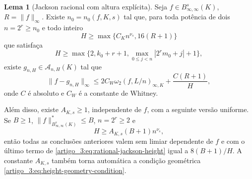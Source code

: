 \documentclass[12pt,a4paper]{article}
\theoremstyle{preciso}
\theoremstyle{definition}
\newcommand{\Aclass}{\mathcal{A}}
\theoremstyle{preciso}
\theoremstyle{preciso}
\newtheorem{lemma}[teorema]{Lema}
\theoremstyle{preciso}
\theoremstyle{preciso}
\theoremstyle{definition}
\theoremstyle{preciso}
\theoremstyle{definition}
\theoremstyle{preciso}
\theoremstyle{preciso}
\theoremstyle{definition}
\begin{document}
\begin{lemma}[Jackson racional com altura explícita]\label{map:artigo_3:4.1}
\label{artigo_3:lem:rational-jackson-height}
Seja $f\in B^s_{\infty,\infty}(K)$, $R=\|f\|_\infty$. Existe
$n_0=n_0(f,K,s)$ tal que, para toda potência de dois $n=2^r\ge n_0$ e todo
inteiro
\[
 H\ge\max\{C_Kn^{\nu_s},16(R+1)\}
\]
que satisfaça
\begin{equation}
 H\ge\max\{2,k_0+r+1,
      \max_{0\le j<n}|2^rm_0+j|+1\},
 \label{artigo_3:eq:height-geometry-condition}
\end{equation}
existe $g_{n,H}\in\Aclass_{n,H}(K)$ tal que
\begin{equation}
 \|f-g_{n,H}\|_\infty
 \le 2C_W\omega_2(f,L/n)_{\infty,K}
      +\frac{C(R+1)}{H},
 \label{artigo_3:eq:rational-jackson-height}
\end{equation}
onde $C$ é absoluto e $C_W$ é a constante de Whitney.

Além disso, existe $A_{K,s}\ge1$, independente de $f$, com a seguinte versão
uniforme. Se $B\ge1$, $\|f\|_{B^s_{\infty,\infty}(K)}^*\le B$, $n=2^r\ge2$
e
\begin{equation}
 H\ge A_{K,s}(B+1)n^{\nu_s},
 \label{artigo_3:eq:uniform-ball-height-threshold}
\end{equation}
então todas as conclusões anteriores valem sem limiar dependente de $f$ e com
o último termo de \eqref{artigo_3:eq:rational-jackson-height} igual a
$8(B+1)/H$. A constante $A_{K,s}$ também torna automática a condição
geométrica \eqref{artigo_3:eq:height-geometry-condition}.
\end{lemma}
\end{document}
